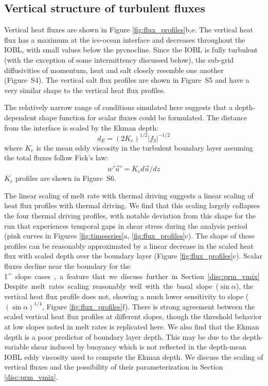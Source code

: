 \documentclass[tc, manuscript]{copernicus}
\begin{document}
\subsection{Vertical structure of turbulent fluxes}

Vertical heat fluxes are shown in Figure \ref{fig:flux_profiles}b,e. The vertical heat flux has a maximum at the ice-ocean interface and decreases throughout the IOBL, with small values below the pycnocline. Since the IOBL is fully turbulent (with the exception of some intermittency discussed below), the sub-grid diffusivities of momentum, heat and salt closely resemble one another (Figure~S4). The vertical salt flux profiles are shown in Figure~S5 and have a very similar shape to the vertical heat flux profiles.

The relatively narrow range of conditions simulated here suggests that a depth-dependent shape function for scalar fluxes could be formulated. The distance from the interface is scaled by the Ekman depth:
\begin{equation}
    d_E = (2 K_e)^{1/2} |f_3|^{-1/2}
\end{equation}
where $K_e$ is the mean eddy viscosity in the turbulent boundary layer assuming the total fluxes follow Fick's law:
\begin{equation}
    \overline{w'\vec{u}'} = K_e d\vec{u}/dz
\end{equation}
$K_e$ profiles are shown in Figure~S6. 

The linear scaling of melt rate with thermal driving suggests a linear scaling of heat flux profiles with thermal driving. We find that this scaling largely collapses the four thermal driving profiles, with notable deviation from this shape for the run that experiences temporal gaps in shear stress during the analysis period (pink curves in Figures \ref{fig:timeseries}a, \ref{fig:flux_profiles}c). The shape of these profiles can be reasonably approximated by a linear decrease in the scaled heat flux with scaled depth over the boundary layer (Figure \ref{fig:flux_profiles}c). Scalar fluxes decline near the boundary for the 1\unit{^{\circ}} slope cases, a feature that we discuss further in Section \ref{disc:prm_vmix}. 

Despite melt rates scaling reasonably well with the basal slope ($\sin \alpha$), the vertical heat flux profile does not, showing a much lower sensitivity to slope ($(\sin\alpha)^{1/4}$, Figure \ref{fig:flux_profiles}f). There is strong agreement between the scaled vertical heat flux profiles at different slopes, though the threshold behavior at low slopes noted in melt rates is replicated here. We also find that the Ekman depth is a poor predictor of boundary layer depth. This may be due to the depth-variable shear induced by buoyancy which is not reflected in the depth-mean IOBL eddy viscosity used to compute the Ekman depth. We discuss the scaling of vertical fluxes and the possibility of their parameterization in Section \ref{disc:prm_vmix}.
\end{document}
